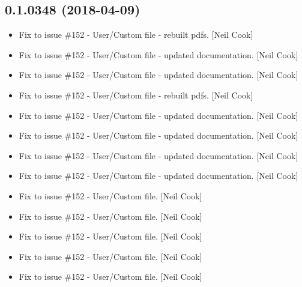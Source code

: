 \documentclass[a4paper,10pt,english]{report}
\begin{document}
\subsection{0.1.0348 (2018-04-09)}
\label{\detokenize{misc/changelog:id465}}\begin{itemize}
\item {} 
Fix to issue \#152 - User/Custom  file - rebuilt pdfs. {[}Neil
Cook{]}

\item {} 
Fix to issue \#152 - User/Custom  file - updated
documentation. {[}Neil Cook{]}

\item {} 
Fix to issue \#152 - User/Custom  file - updated
documentation. {[}Neil Cook{]}

\item {} 
Fix to issue \#152 - User/Custom  file - rebuilt pdfs. {[}Neil
Cook{]}

\item {} 
Fix to issue \#152 - User/Custom  file - updated
documentation. {[}Neil Cook{]}

\item {} 
Fix to issue \#152 - User/Custom  file - updated
documentation. {[}Neil Cook{]}

\item {} 
Fix to issue \#152 - User/Custom  file - updated
documentation. {[}Neil Cook{]}

\item {} 
Fix to issue \#152 - User/Custom  file - updated
documentation. {[}Neil Cook{]}

\item {} 
Fix to issue \#152 - User/Custom  file. {[}Neil Cook{]}

\item {} 
Fix to issue \#152 - User/Custom  file. {[}Neil Cook{]}

\item {} 
Fix to issue \#152 - User/Custom  file. {[}Neil Cook{]}

\item {} 
Fix to issue \#152 - User/Custom  file. {[}Neil Cook{]}

\item {} 
Fix to issue \#152 - User/Custom  file. {[}Neil Cook{]}


\end{itemize}
\end{document}
